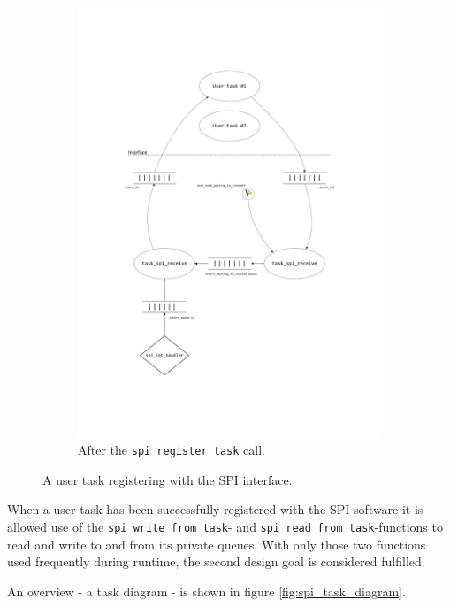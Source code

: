 \begin{figure}[htb]
\begin{subfigure}{0.49\textwidth}
    \includegraphics[width=\textwidth,clip,trim=90 480 90 150]{content/04_communication/figures/spi_task_diagram_initial_2.pdf}
    \caption{After the \texttt{spi\_register\_task} call.}
    \label{fig:spi_task_diagram_initial_2}
  \end{subfigure}
  \caption{A user task registering with the SPI interface.}
  \label{fig:spi_register_task}
\end{figure}%

When a user task has been successfully registered with the SPI software it is allowed use of the \texttt{spi\_write\_from\_task}- and \texttt{spi\_read\_from\_task}-functions to read and write to and from its private queues. With only those two functions used frequently during runtime, the second design goal is considered fulfilled.

An overview - a task diagram - is shown in figure \ref{fig:spi_task_diagram}.



